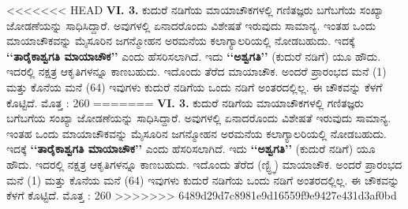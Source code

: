 <<<<<<< HEAD
\textbf{VI. 3.} ಕುದುರೆ ನಡಿಗೆಯ ಮಾಯಾಚೌಕಗಳಲ್ಲಿ ಗಣಿತಜ್ಞರು ಬಗೆಬಗೆಯ ಸಂಖ್ಯಾ ಜೋಡಣೆಯನ್ನು ಸಾಧಿಸಿದ್ದಾರೆ. ಅವುಗಳಲ್ಲಿ ಏನಾದರೊಂದು ವಿಶೇಷತೆ ಇರುವುದು ಸಾಮಾನ್ಯ. ಇಂತಹ ಒಂದು ಮಾಯಾಚೌಕವನ್ನು ಮೈಸೂರಿನ ಜಗನ್ಮೋಹನ ಅರಮನೆಯ ಕಲಾಗ್ಯಾಲರಿಯಲ್ಲಿ ನೋಡಬಹುದು. ಇದಕ್ಕೆ  \textbf{‘‘ತಾರೈಕಾಶ್ವಗತಿ ಮಾಯಾಚೌಕ’’} ಎಂದು ಹೆಸರಿಸಲಾಗಿದೆ. ಇದು \textbf{‘‘ಅಶ್ವಗತಿ’’} (ಕುದುರೆ ನಡಿಗೆ) ಯೂ ಹೌದು. ಇದರಲ್ಲಿ ನಕ್ಷತ್ರ ಆಕೃತಿಗಳನ್ನೂ ಕಾಣಬಹುದು. ಇದೊಂದು ತೆರೆದ ಮಾಯಾಚೌಕ. ಅಂದರೆ ಪ್ರಾರಂಭದ ಮನೆ (1) ಮತ್ತು ಕೊನೆಯ ಮನೆ (64) ಇವುಗಳು ಕುದುರೆ ನಡಿಗೆಯ ಒಂದು ನಡಿಗೆ ಅಂತರದಲ್ಲಿಲ್ಲ. ಈ ಚೌಕವನ್ನು ಕೆಳಗೆ ಕೊಟ್ಟಿದೆ. ಮೊತ್ತ : 260
=======
\textbf{VI. 3.} ಕುದುರೆ ನಡಿಗೆಯ ಮಾಯಾಚೌಕಗಳಲ್ಲಿ ಗಣಿತಜ್ಞರು ಬಗೆಬಗೆಯ ಸಂಖ್ಯಾ\- ಜೋಡಣೆಯನ್ನು ಸಾಧಿಸಿದ್ದಾರೆ. ಅವುಗಳಲ್ಲಿ ಏನಾದರೊಂದು ವಿಶೇಷತೆ ಇರುವುದು ಸಾಮಾನ್ಯ.\- ಇಂತಹ ಒಂದು ಮಾಯಾಚೌಕವನ್ನು ಮೈಸೂರಿನ ಜಗನ್ಮೋಹನ ಅರಮನೆಯ ಕಲಾಗ್ಯಾಲರಿಯಲ್ಲಿ ನೋಡಬಹುದು. ಇದಕ್ಕೆ  \textbf{‘‘ತಾರೈಕಾಶ್ವಗತಿ ಮಾಯಾಚೌಕ’’} ಎಂದು ಹೆಸರಿಸ\-ಲಾಗಿದೆ. ಇದು \textbf{‘‘ಅಶ್ವಗತಿ’’} (ಕುದುರೆ ನಡಿಗೆ) ಯೂ ಹೌದು. ಇದರಲ್ಲಿ ನಕ್ಷತ್ರ ಆಕೃತಿ\-ಗಳನ್ನೂ ಕಾಣಬಹುದು. ಇದೊಂದು ತೆರೆದ (ಣ್ಟ್ಛ್ಞಿ) ಮಾಯಾಚೌಕ. ಅಂದರೆ ಪ್ರಾರಂಭದ ಮನೆ (1) ಮತ್ತು ಕೊನೆಯ ಮನೆ (64) ಇವುಗಳು ಕುದುರೆ ನಡಿಗೆಯ ಒಂದು ನಡಿಗೆ ಅಂತರದಲ್ಲಿಲ್ಲ. ಈ ಚೌಕವನ್ನು ಕೆಳಗೆ ಕೊಟ್ಟಿದೆ. ಮೊತ್ತ : 260
>>>>>>> 6489d29d7c8981e9d16559f9e9427e431d3af0bd
